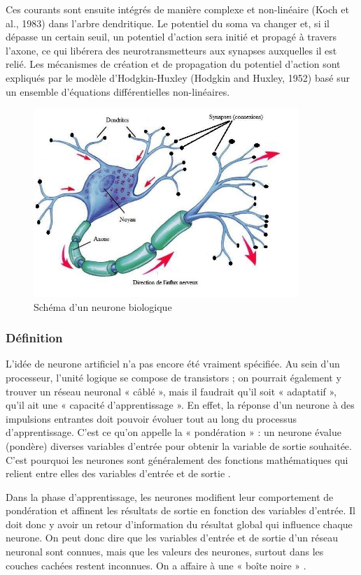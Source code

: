 \documentclass[12pt]{article}
\begin{document}
Ces courants sont ensuite intégrés de manière complexe et non-linéaire (Koch et al., 1983) dans l’arbre dendritique. Le potentiel du soma va changer et, si il dépasse un certain seuil, un potentiel d’action sera initié et propagé à travers l’axone, ce qui libérera des neurotransmetteurs aux synapses auxquelles il est relié. Les mécanismes de création et de propagation du potentiel d’action sont expliqués par le modèle d’Hodgkin-Huxley (Hodgkin and Huxley, 1952) basé sur un ensemble d’équations différentielles non-linéaires.
\begin{figure}[h]
\centering
\includegraphics[width=10cm]{img-Chapiter-1/neurone.jpeg}
\caption{Schéma d’un neurone biologique}
\end{figure}
\subsubsection{Définition}
L'idée de neurone artificiel n’a pas encore été vraiment spécifiée. Au sein d'un processeur, l’unité logique se compose de transistors ; on pourrait également y trouver un réseau neuronal « câblé », mais il faudrait qu’il soit « adaptatif », qu’il ait une « capacité d'apprentissage ». En effet, la réponse d'un neurone à des impulsions entrantes doit pouvoir évoluer tout au long du processus d'apprentissage. C'est ce qu'on appelle la « pondération » : un neurone évalue (pondère) diverses variables d'entrée pour obtenir la variable de sortie souhaitée. C'est pourquoi les neurones sont généralement des fonctions mathématiques qui relient entre elles des variables d'entrée et de sortie \cite{10}.

Dans la phase d'apprentissage, les neurones modifient leur comportement de pondération et affinent les résultats de sortie en fonction des variables d'entrée. Il doit donc y avoir un retour d'information du résultat global qui influence chaque neurone. On peut donc dire que les variables d'entrée et de sortie d'un réseau neuronal sont connues, mais que les valeurs des neurones, surtout dans les couches cachées restent inconnues. On a affaire à une « boîte noire » \cite{10}.
\end{document}
